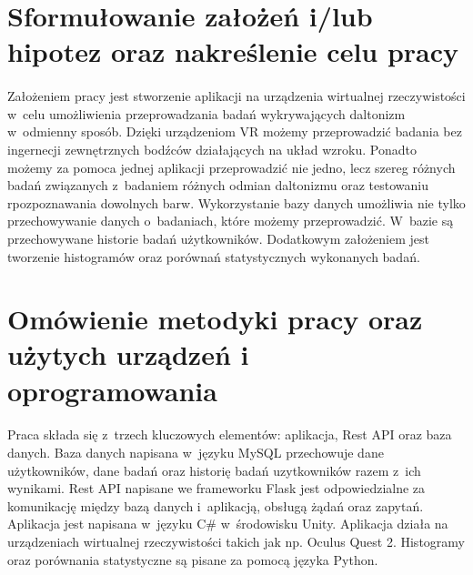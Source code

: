 \documentclass[12pt, letterpaper]{article}
\begin{document}
\section{Sformułowanie założeń i/lub hipotez oraz nakreślenie celu pracy}
\paragraph{}
Założeniem pracy jest stworzenie aplikacji na urządzenia wirtualnej rzeczywistości w~celu umożliwienia przeprowadzania badań wykrywających daltonizm w~odmienny sposób. Dzięki urządzeniom VR możemy przeprowadzić badania bez ingernecji zewnętrznych bodźców działających na układ wzroku. Ponadto możemy za pomoca jednej aplikacji przeprowadzić nie jedno, lecz szereg różnych badań związanych z~badaniem różnych odmian daltonizmu oraz testowaniu rpozpoznawania dowolnych barw. Wykorzystanie bazy danych umożliwia nie tylko przechowywanie danych o~badaniach, które możemy przeprowadzić. W~bazie są przechowywane historie badań użytkowników. Dodatkowym założeniem jest tworzenie histogramów oraz porównań statystycznych wykonanych badań. 

\section{Omówienie metodyki pracy oraz użytych urządzeń i oprogramowania}
\paragraph{}
Praca składa się z~trzech kluczowych elementów: aplikacja, Rest API oraz baza danych. Baza danych napisana w~języku MySQL przechowuje dane użytkowników, dane badań oraz historię badań uzytkowników razem z~ich wynikami. Rest API napisane we frameworku Flask jest odpowiedzialne za komunikację między bazą danych i~aplikacją, obsługą żądań oraz zapytań. Aplikacja jest napisana w~języku C# w~środowisku Unity. Aplikacja działa na urządzeniach wirtualnej rzeczywistości takich jak np. Oculus Quest 2. Histogramy oraz porównania statystyczne są pisane za pomocą języka Python.
\end{document}
